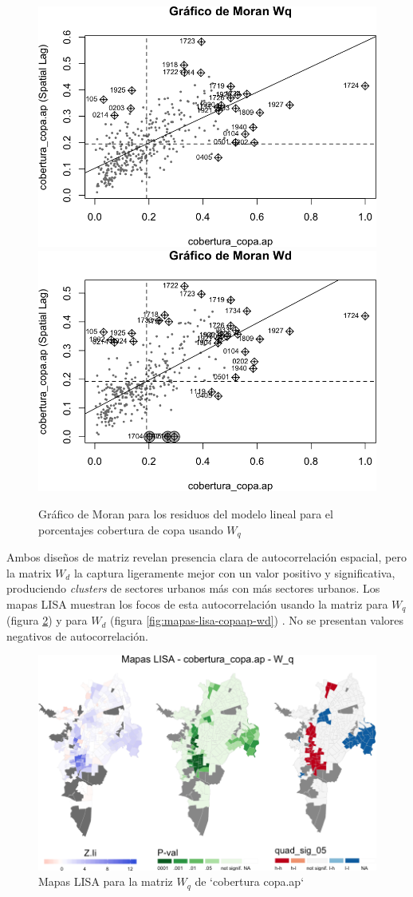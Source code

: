 \documentclass[12pt,]{book}
\begin{document}
\begin{figure}
\includegraphics[width=0.49\linewidth]{tesis-unigis_files/figure-latex/moranplot-copaap-w-1} \includegraphics[width=0.49\linewidth]{tesis-unigis_files/figure-latex/moranplot-copaap-w-2} \caption{Gráfico de Moran para los residuos del modelo lineal para el porcentajes cobertura de copa usando $W_{q}$}\label{fig:moranplot-copaap-w}
\end{figure}

Ambos diseños de matriz revelan presencia clara de autocorrelación
espacial, pero la matrix \(W_d\) la captura ligeramente mejor con un
valor positivo y significativa, produciendo \emph{clusters} de sectores
urbanos más con más sectores urbanos. Los mapas LISA muestran los focos
de esta autocorrelación usando la matriz para \(W_q\) (figura
\ref{fig:mapas-lisa-copaap-wq}) y para \(W_d\) (figura
\ref{fig:mapas-lisa-copaap-wd}) . No se presentan valores negativos de
autocorrelación.

\begin{figure}
\includegraphics[width=1\linewidth]{tesis-unigis_files/figure-latex/mapas-lisa-copaap-wq-1} \caption{Mapas LISA para la matriz $W_q$ de `cobertura copa.ap`}\label{fig:mapas-lisa-copaap-wq}
\end{figure}
\end{document}
